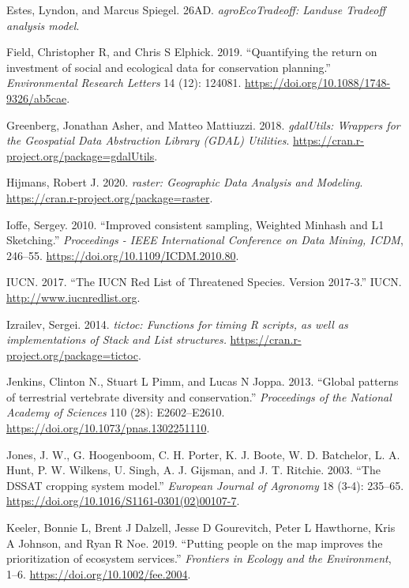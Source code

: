 \documentclass[
]{article}
\begin{document}
\leavevmode\hypertarget{ref-R-agroEcoTradeoff}{}%
Estes, Lyndon, and Marcus Spiegel. 26AD. \emph{agroEcoTradeoff: Landuse Tradeoff analysis model}.

\leavevmode\hypertarget{ref-Field2019}{}%
Field, Christopher R, and Chris S Elphick. 2019. ``Quantifying the return on investment of social and ecological data for conservation planning.'' \emph{Environmental Research Letters} 14 (12): 124081. \url{https://doi.org/10.1088/1748-9326/ab5cae}.

\leavevmode\hypertarget{ref-R-gdalUtils}{}%
Greenberg, Jonathan Asher, and Matteo Mattiuzzi. 2018. \emph{gdalUtils: Wrappers for the Geospatial Data Abstraction Library (GDAL) Utilities}. \url{https://cran.r-project.org/package=gdalUtils}.

\leavevmode\hypertarget{ref-R-raster}{}%
Hijmans, Robert J. 2020. \emph{raster: Geographic Data Analysis and Modeling}. \url{https://cran.r-project.org/package=raster}.

\leavevmode\hypertarget{ref-Ioffe2010}{}%
Ioffe, Sergey. 2010. ``Improved consistent sampling, Weighted Minhash and L1 Sketching.'' \emph{Proceedings - IEEE International Conference on Data Mining, ICDM}, 246--55. \url{https://doi.org/10.1109/ICDM.2010.80}.

\leavevmode\hypertarget{ref-IUCN2017}{}%
IUCN. 2017. ``The IUCN Red List of Threatened Species. Version 2017-3.'' IUCN. \url{http://www.iucnredlist.org}.

\leavevmode\hypertarget{ref-R-tictoc}{}%
Izrailev, Sergei. 2014. \emph{tictoc: Functions for timing R scripts, as well as implementations of Stack and List structures.} \url{https://cran.r-project.org/package=tictoc}.

\leavevmode\hypertarget{ref-Jenkins2013}{}%
Jenkins, Clinton N., Stuart L Pimm, and Lucas N Joppa. 2013. ``Global patterns of terrestrial vertebrate diversity and conservation.'' \emph{Proceedings of the National Academy of Sciences} 110 (28): E2602--E2610. \url{https://doi.org/10.1073/pnas.1302251110}.

\leavevmode\hypertarget{ref-Jones2003}{}%
Jones, J. W., G. Hoogenboom, C. H. Porter, K. J. Boote, W. D. Batchelor, L. A. Hunt, P. W. Wilkens, U. Singh, A. J. Gijsman, and J. T. Ritchie. 2003. ``The DSSAT cropping system model.'' \emph{European Journal of Agronomy} 18 (3-4): 235--65. \url{https://doi.org/10.1016/S1161-0301(02)00107-7}.

\leavevmode\hypertarget{ref-Keeler2019}{}%
Keeler, Bonnie L, Brent J Dalzell, Jesse D Gourevitch, Peter L Hawthorne, Kris A Johnson, and Ryan R Noe. 2019. ``Putting people on the map improves the prioritization of ecosystem services.'' \emph{Frontiers in Ecology and the Environment}, 1--6. \url{https://doi.org/10.1002/fee.2004}.
\end{document}
